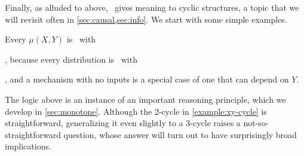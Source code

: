 Finally, as alluded to above, \scibility\ gives meaning to cyclic structures,
    a topic that we will revisit often in \cref{sec:causal,sec:info}. 
We start with some simple examples. 
\begin{example}
        \label{example:xy-cycle}
    Every $\mu(X,Y)$ is \cible\ with
    ,
    because every distribution is \cible\ with
    ,
    and a mechanism with no inputs is a special case of one that can depend on $Y$.
    \qedhere
\end{example}
The logic above is an instance of an important reasoning principle,
    which we develop in \cref{sec:monotone}. 
Although the 2-cycle in \cref{example:xy-cycle} is straightforward, generalizing it even slightly to a 3-cycle raises a not-so-straightforward question, 
    whose answer will turn out to have surprisingly broad implications.
     
